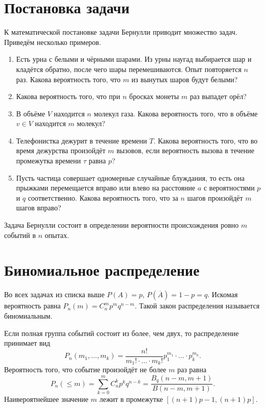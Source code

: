 \section{Постановка задачи}
    К математической постановке задачи Бернулли приводит множество задач.
    Приведём несколько примеров.
    \begin{enumerate}
        \item Есть урна с белыми и чёрными шарами. Из урны наугад выбирается шар
            и кладётся обратно, после чего шары перемешиваются. Опыт повторяется
            \( n \) раз. Какова вероятность того, что \( m \) из вынутых шаров
            будут белыми?
        \item Какова вероятность того, что при \( n \) бросках монеты \( m \)
            раз выпадет орёл?
        \item В объёме \( V \) находится \( n \) молекул газа. Какова
            вероятность того, что в объёме \( v \in V \) находится
            \( m \) молекул?
        \item Телефонистка дежурит в течение времени \( T \). Какова вероятность
            того, что во время дежурства произойдёт \( m \) вызовов, если
            вероятность вызова в течение промежутка времени \( \tau \)
            равна \( p \)?
        \item Пусть частица совершает одномерные случайные блуждания, то есть
            она прыжками перемещается вправо или влево на расстояние \( a \) с
            вероятностями \( p \) и \( q \) соответственно. Какова вероятность
            того, что за \( n \) шагов произойдёт \( m \) шагов вправо?
    \end{enumerate}

    Задача Бернулли состоит в определении вероятности происхождения ровно
    \( m \) событий в \( n \) опытах.

\section{Биномиальное распределение}
    Во всех задачах из списка выше \( P(A) = p \), \( P(\overline{A}) = 1 - p =
    q \). Искомая вероятность равна \( P_n(m) = C_n^m p^m q^{n-m} \). Такой
    закон распределения называется биномиальным.

    Если полная группа событий состоит из более, чем двух, то распределение
    принимает вид
    \[
        P_n(m_1, \ldots, m_k) =
            \frac{n!}{m_1! \cdot\ldots\cdot m_k!}
            p_1^{m_1} \cdot\ldots\cdot p_k^{m_k}.
    \]
    Вероятность того, что событие произойдёт не более \( m \) раз равна
    \[
        P_n(\le m) = \sum_{k=0}^m C_n^k p^k q^{n-k} =
        \frac{B_q(n-m, m+1)}{B(n-m, m+1)}.
    \]
    Наивероятнейшее значение \( m \) лежит в промежутке
    \( [(n+1)p-1, (n+1)p] \).

